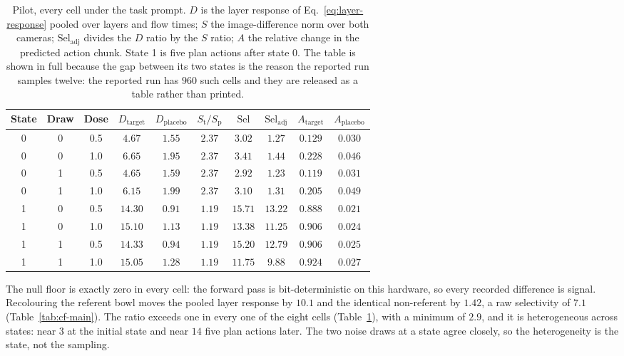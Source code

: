 \begin{table}[t]
\caption{Pilot, every cell under the task prompt. $D$ is the layer response of
Eq.~\ref{eq:layer-response} pooled over layers and flow times; $S$ the
image-difference norm over both cameras; $\mathrm{Sel}_{\mathrm{adj}}$ divides
the $D$ ratio by the $S$ ratio; $A$ the relative change in the predicted action
chunk. State 1 is five plan actions after state 0. The table is shown in full
because the gap between its two states is the reason the reported run samples
twelve: the reported run has $960$ such cells and they are released as a table
rather than printed.}
\label{tab:cf-cells}
\begin{center}
\footnotesize
\begin{tabular}{cccccccccc}
\hline
State & Draw & Dose & $D_{\mathrm{target}}$ & $D_{\mathrm{placebo}}$ & $S_{\mathrm{t}}/S_{\mathrm{p}}$ & $\mathrm{Sel}$ & $\mathrm{Sel}_{\mathrm{adj}}$ & $A_{\mathrm{target}}$ & $A_{\mathrm{placebo}}$ \\
\hline
0 & 0 & 0.5 & $4.67$  & $1.55$ & $2.37$ & $3.02$  & $1.27$  & $0.129$ & $0.030$ \\
0 & 0 & 1.0 & $6.65$  & $1.95$ & $2.37$ & $3.41$  & $1.44$  & $0.228$ & $0.046$ \\
0 & 1 & 0.5 & $4.65$  & $1.59$ & $2.37$ & $2.92$  & $1.23$  & $0.119$ & $0.031$ \\
0 & 1 & 1.0 & $6.15$  & $1.99$ & $2.37$ & $3.10$  & $1.31$  & $0.205$ & $0.049$ \\
1 & 0 & 0.5 & $14.30$ & $0.91$ & $1.19$ & $15.71$ & $13.22$ & $0.888$ & $0.021$ \\
1 & 0 & 1.0 & $15.10$ & $1.13$ & $1.19$ & $13.38$ & $11.25$ & $0.906$ & $0.024$ \\
1 & 1 & 0.5 & $14.33$ & $0.94$ & $1.19$ & $15.20$ & $12.79$ & $0.906$ & $0.025$ \\
1 & 1 & 1.0 & $15.05$ & $1.28$ & $1.19$ & $11.75$ & $9.88$  & $0.924$ & $0.027$ \\
\hline
\end{tabular}
\end{center}
\end{table}

The null floor is exactly zero in every cell: the forward pass is
bit-deterministic on this hardware, so every recorded difference is signal.
Recolouring the referent bowl moves the pooled layer response by $10.1$ and the
identical non-referent by $1.42$, a raw selectivity of $7.1$
(Table~\ref{tab:cf-main}). The ratio exceeds one in every one of the eight
cells (Table~\ref{tab:cf-cells}), with a minimum of $2.9$, and it is
heterogeneous across states: near $3$ at the initial state and near $14$ five
plan actions later. The two noise draws at a state agree closely, so the
heterogeneity is the state, not the sampling.

